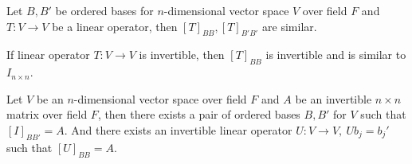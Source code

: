 	\begin{remark}
		Let $B,B'$ be ordered bases for $n$-dimensional vector space $V$ over field $F$ and $T : V \to V$ be a linear operator, then $[T]_{BB},[T]_{B'B'}$ are similar.
	\end{remark}
	\begin{remark}
		If linear operator $T : V \to V$ is invertible, then $[T]_{BB}$ is invertible and is similar to $I_{n \times n}$.
	\end{remark}
	\begin{remark}
		Let $V$ be an $n$-dimensional vector space over field $F$ and $A$ be an invertible $n \times n$ matrix over field $F$, then there exists a pair of ordered bases $B,B'$ for $V$ such that $[I]_{BB'} = A$. And there exists an invertible linear operator $U : V \to V,\ Ub_j = b_j'$ such that $[U]_{BB} = A$.
	\end{remark}
